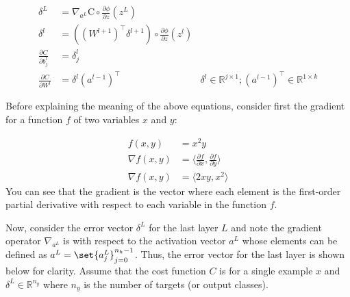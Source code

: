 \documentclass{article}
\DeclarePairedDelimiter\set\{\}
\begin{document}
\begin{align}
	\delta^{L}                            & = \nabla_{a^{L}} \text{C} \circ \frac{\partial \phi}{\partial z}(z^{L})                                                                                                         \\
	\delta^{l}                            & = ((W^{l+1})^{\top} \delta^{l+1}) \circ \frac{\partial \phi}{\partial z}(z^{l})                                                                                                 \\
	\frac{\partial C}{\partial b_j^{l}}   & = \delta_j^{l}                                                                                                                                                                  \\
	\frac{ \partial C }{ \partial W^{l} } & = \delta^{l} (a^{l-1})^{\top}                                                   & \text{$\delta^{l} \in \mathbb{R}^{j \times 1}; (a^{l-1})^{\top} \in \mathbb{R}^{1 \times k}$}
\end{align}

Before explaining the meaning of the above equations,
consider first the gradient for a function $f$ of two variables $x$ and $y$:

\begin{align}
	f(x, y)        & = x^{2} y                                                                      \\
	\nabla f(x, y) & = \langle \frac{\partial f}{\partial x}, \frac{\partial f}{\partial y} \rangle \\
	\nabla f(x, y) & = \langle 2xy, x^{2} \rangle
\end{align}
You can see that the gradient is the vector where each element is the first-order
partial derivative with respect to each variable in the function $f$.

Now, consider the error vector $\delta^{L}$ for the last layer $L$ and note the gradient operator
$\nabla_{a^{L}}$ is with respect to the activation vector $a^{L}$ whose elements
can be defined as $a^{L} = \set{a_j^{L}}_{j=0}^{n_h - 1}$.
Thus, the error vector for the last layer is shown below for clarity. Assume that the cost
function $C$ is for a single example $x$ and $\delta^{L} \in \mathbb{R}^{n_y}$
where $n_y$ is the number of targets (or output classes).
\end{document}

